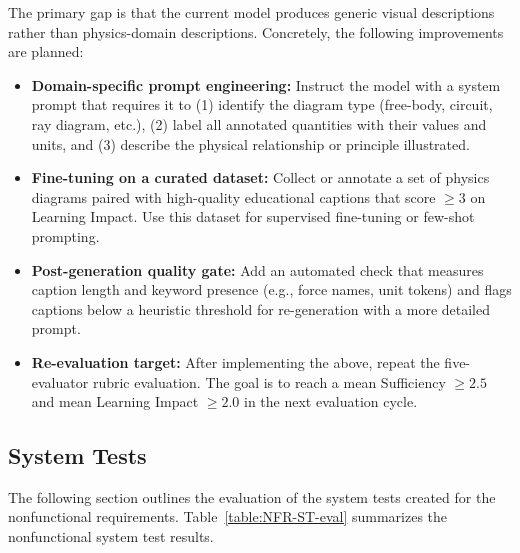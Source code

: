 \documentclass[12pt, titlepage]{article}
\begin{document}
The primary gap is that the current model produces generic visual descriptions rather than physics-domain descriptions. Concretely, the following improvements are planned:
\begin{itemize}
  \item \textbf{Domain-specific prompt engineering:} Instruct the model with a system prompt that requires it to (1) identify the diagram type (free-body, circuit, ray diagram, etc.), (2) label all annotated quantities with their values and units, and (3) describe the physical relationship or principle illustrated.
  \item \textbf{Fine-tuning on a curated dataset:} Collect or annotate a set of physics diagrams paired with high-quality educational captions that score $\geq 3$ on Learning Impact. Use this dataset for supervised fine-tuning or few-shot prompting.
  \item \textbf{Post-generation quality gate:} Add an automated check that measures caption length and keyword presence (e.g., force names, unit tokens) and flags captions below a heuristic threshold for re-generation with a more detailed prompt.
  \item \textbf{Re-evaluation target:} After implementing the above, repeat the five-evaluator rubric evaluation. The goal is to reach a mean Sufficiency $\geq 2.5$ and mean Learning Impact $\geq 2.0$ in the next evaluation cycle.
\end{itemize}

\subsection{System Tests}
The following section outlines the evaluation of the system tests
created for the
nonfunctional requirements. Table~\ref{table:NFR-ST-eval} summarizes
the nonfunctional system test results.

\newcommand{\nfrtestcount}{\stepcounter{nfrtestcase}\thenfrtestcase}
\end{document}
